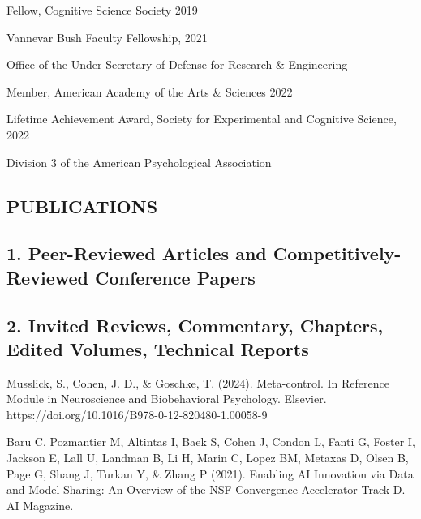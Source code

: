 \documentclass[10 pt]{article}
\begin{document}
Fellow, Cognitive Science Society \hspace{3.54in} 2019
    \smallskip

Vannevar Bush Faculty Fellowship, \hspace{3.42in} 2021

Office of the Under Secretary of Defense for Research \& Engineering
    \smallskip

Member, American Academy of the Arts \& Sciences \hspace{2.37in} 2022
    \smallskip

Lifetime Achievement Award, Society for Experimental and Cognitive Science, \hspace{0.77in} 2022

Division 3 of the American Psychological Association

\newpage



    \begin{center}
\section*{PUBLICATIONS} \label{secPUBLICATIONS}
    \end{center}

\subsection*{1. Peer-Reviewed Articles and Competitively-Reviewed Conference Papers} \label{secPUBLICATIONS1}

\nocite{*} %
\printbibliography[heading = none] %
    \medskip

\subsection*{2. Invited Reviews, Commentary, Chapters, Edited Volumes, Technical Reports} \label{secPUBLICATIONS2}
    \smallskip

Musslick, S., Cohen, J. D., \& Goschke, T. (2024). Meta-control. In Reference Module in Neuroscience and Biobehavioral Psychology. Elsevier. https://doi.org/10.1016/B978-0-12-820480-1.00058-9

Baru C, Pozmantier M, Altintas I, Baek S, Cohen J, Condon L, Fanti G, Foster I, Jackson E, Lall U, Landman B, Li H, Marin C, Lopez BM, Metaxas D, Olsen B, Page G, Shang J, Turkan Y, \& Zhang P (2021). Enabling AI Innovation via Data and Model Sharing: An Overview of the NSF Convergence Accelerator Track D. AI Magazine.
\end{document}
